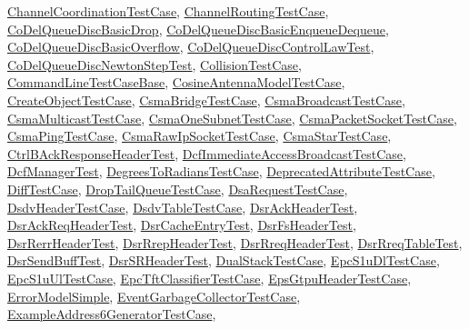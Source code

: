 \hyperlink{classChannelCoordinationTestCase}{Channel\+Coordination\+Test\+Case}, \hyperlink{classChannelRoutingTestCase}{Channel\+Routing\+Test\+Case}, \hyperlink{classCoDelQueueDiscBasicDrop}{Co\+Del\+Queue\+Disc\+Basic\+Drop}, \hyperlink{classCoDelQueueDiscBasicEnqueueDequeue}{Co\+Del\+Queue\+Disc\+Basic\+Enqueue\+Dequeue}, \hyperlink{classCoDelQueueDiscBasicOverflow}{Co\+Del\+Queue\+Disc\+Basic\+Overflow}, \hyperlink{classCoDelQueueDiscControlLawTest}{Co\+Del\+Queue\+Disc\+Control\+Law\+Test}, \hyperlink{classCoDelQueueDiscNewtonStepTest}{Co\+Del\+Queue\+Disc\+Newton\+Step\+Test}, \hyperlink{classCollisionTestCase}{Collision\+Test\+Case}, \hyperlink{classCommandLineTestCaseBase}{Command\+Line\+Test\+Case\+Base}, \hyperlink{classCosineAntennaModelTestCase}{Cosine\+Antenna\+Model\+Test\+Case}, \hyperlink{classCreateObjectTestCase}{Create\+Object\+Test\+Case}, \hyperlink{classCsmaBridgeTestCase}{Csma\+Bridge\+Test\+Case}, \hyperlink{classCsmaBroadcastTestCase}{Csma\+Broadcast\+Test\+Case}, \hyperlink{classCsmaMulticastTestCase}{Csma\+Multicast\+Test\+Case}, \hyperlink{classCsmaOneSubnetTestCase}{Csma\+One\+Subnet\+Test\+Case}, \hyperlink{classCsmaPacketSocketTestCase}{Csma\+Packet\+Socket\+Test\+Case}, \hyperlink{classCsmaPingTestCase}{Csma\+Ping\+Test\+Case}, \hyperlink{classCsmaRawIpSocketTestCase}{Csma\+Raw\+Ip\+Socket\+Test\+Case}, \hyperlink{classCsmaStarTestCase}{Csma\+Star\+Test\+Case}, \hyperlink{classCtrlBAckResponseHeaderTest}{Ctrl\+B\+Ack\+Response\+Header\+Test}, \hyperlink{classDcfImmediateAccessBroadcastTestCase}{Dcf\+Immediate\+Access\+Broadcast\+Test\+Case}, \hyperlink{classDcfManagerTest}{Dcf\+Manager\+Test}, \hyperlink{classDegreesToRadiansTestCase}{Degrees\+To\+Radians\+Test\+Case}, \hyperlink{classDeprecatedAttributeTestCase}{Deprecated\+Attribute\+Test\+Case}, \hyperlink{classDiffTestCase}{Diff\+Test\+Case}, \hyperlink{classDropTailQueueTestCase}{Drop\+Tail\+Queue\+Test\+Case}, \hyperlink{classDsaRequestTestCase}{Dsa\+Request\+Test\+Case}, \hyperlink{classDsdvHeaderTestCase}{Dsdv\+Header\+Test\+Case}, \hyperlink{classDsdvTableTestCase}{Dsdv\+Table\+Test\+Case}, \hyperlink{classDsrAckHeaderTest}{Dsr\+Ack\+Header\+Test}, \hyperlink{classDsrAckReqHeaderTest}{Dsr\+Ack\+Req\+Header\+Test}, \hyperlink{classDsrCacheEntryTest}{Dsr\+Cache\+Entry\+Test}, \hyperlink{classDsrFsHeaderTest}{Dsr\+Fs\+Header\+Test}, \hyperlink{classDsrRerrHeaderTest}{Dsr\+Rerr\+Header\+Test}, \hyperlink{classDsrRrepHeaderTest}{Dsr\+Rrep\+Header\+Test}, \hyperlink{classDsrRreqHeaderTest}{Dsr\+Rreq\+Header\+Test}, \hyperlink{classDsrRreqTableTest}{Dsr\+Rreq\+Table\+Test}, \hyperlink{classDsrSendBuffTest}{Dsr\+Send\+Buff\+Test}, \hyperlink{classDsrSRHeaderTest}{Dsr\+S\+R\+Header\+Test}, \hyperlink{classDualStackTestCase}{Dual\+Stack\+Test\+Case}, \hyperlink{classEpcS1uDlTestCase}{Epc\+S1u\+Dl\+Test\+Case}, \hyperlink{classEpcS1uUlTestCase}{Epc\+S1u\+Ul\+Test\+Case}, \hyperlink{classEpcTftClassifierTestCase}{Epc\+Tft\+Classifier\+Test\+Case}, \hyperlink{classEpsGtpuHeaderTestCase}{Eps\+Gtpu\+Header\+Test\+Case}, \hyperlink{classErrorModelSimple}{Error\+Model\+Simple}, \hyperlink{classEventGarbageCollectorTestCase}{Event\+Garbage\+Collector\+Test\+Case}, \hyperlink{classExampleAddress6GeneratorTestCase}{Example\+Address6\+Generator\+Test\+Case}, 